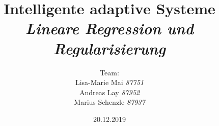 

\title{\textbf{Intelligente adaptive Systeme}\\\textit{Lineare Regression und Regularisierung}}
\author{Team:\\Lisa-Marie Mai \textit{87751}\\Andreas Lay \textit{87952}\\Marius Schenzle \textit{87937} \vspace{10px}}
\date{20.12.2019}


\doublespacing
{}
\maketitle
\newpage
\tableofcontents
\newpage
\singlespacing
{}


\newpage


\newpage

% 


